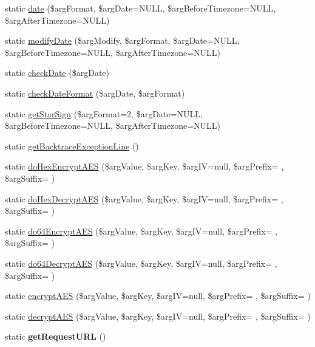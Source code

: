 \begin{DoxyCompactItemize}
\item 
static \hyperlink{class_generic_utilities_ad97b1434345f599d8dc23a5c74321684}{date} (\$arg\+Format, \$arg\+Date=N\+U\+L\+L, \$arg\+Before\+Timezone=N\+U\+L\+L, \$arg\+After\+Timezone=N\+U\+L\+L)
\item 
static \hyperlink{class_generic_utilities_a52a77780ed8600bfd00d2ee18d750f27}{modify\+Date} (\$arg\+Modify, \$arg\+Format, \$arg\+Date=N\+U\+L\+L, \$arg\+Before\+Timezone=N\+U\+L\+L, \$arg\+After\+Timezone=N\+U\+L\+L)
\item 
static \hyperlink{class_generic_utilities_a376a57d805b154b0cf59bffc88c4645f}{check\+Date} (\$arg\+Date)
\item 
static \hyperlink{class_generic_utilities_abd8c463fe50eb90852c0878ab44824ed}{check\+Date\+Format} (\$arg\+Date, \$arg\+Format)
\item 
static \hyperlink{class_generic_utilities_aae536b46e2b27f08f42a705a4c3a2725}{get\+Star\+Sign} (\$arg\+Format=2, \$arg\+Date=N\+U\+L\+L, \$arg\+Before\+Timezone=N\+U\+L\+L, \$arg\+After\+Timezone=N\+U\+L\+L)
\item 
static \hyperlink{class_generic_utilities_a2e121677b4c320aeffd646bbae8fe15b}{get\+Backtrace\+Exception\+Line} ()
\item 
static \hyperlink{class_generic_utilities_a821cf93b7e1f094ed97beff7fd7935f0}{do\+Hex\+Encrypt\+A\+E\+S} (\$arg\+Value, \$arg\+Key, \$arg\+I\+V=null, \$arg\+Prefix= \textquotesingle{}\textquotesingle{}, \$arg\+Suffix= \textquotesingle{}\textquotesingle{})
\item 
static \hyperlink{class_generic_utilities_a2a63c8d8379849d9f78fc4a8943a197e}{do\+Hex\+Decrypt\+A\+E\+S} (\$arg\+Value, \$arg\+Key, \$arg\+I\+V=null, \$arg\+Prefix= \textquotesingle{}\textquotesingle{}, \$arg\+Suffix= \textquotesingle{}\textquotesingle{})
\item 
static \hyperlink{class_generic_utilities_a402d3887fd9fcb5397ed9c66bd8160bd}{do64\+Encrypt\+A\+E\+S} (\$arg\+Value, \$arg\+Key, \$arg\+I\+V=null, \$arg\+Prefix= \textquotesingle{}\textquotesingle{}, \$arg\+Suffix= \textquotesingle{}\textquotesingle{})
\item 
static \hyperlink{class_generic_utilities_a0925b105d9a8bd0ccc30a373f5c94279}{do64\+Decrypt\+A\+E\+S} (\$arg\+Value, \$arg\+Key, \$arg\+I\+V=null, \$arg\+Prefix= \textquotesingle{}\textquotesingle{}, \$arg\+Suffix= \textquotesingle{}\textquotesingle{})
\item 
static \hyperlink{class_generic_utilities_a1002caa7da444f9c5abc9fda33f788ed}{encrypt\+A\+E\+S} (\$arg\+Value, \$arg\+Key, \$arg\+I\+V=null, \$arg\+Prefix= \textquotesingle{}\textquotesingle{}, \$arg\+Suffix= \textquotesingle{}\textquotesingle{})
\item 
static \hyperlink{class_generic_utilities_a57c8d906832d1a335c65dc3c121ece3f}{decrypt\+A\+E\+S} (\$arg\+Value, \$arg\+Key, \$arg\+I\+V=null, \$arg\+Prefix= \textquotesingle{}\textquotesingle{}, \$arg\+Suffix= \textquotesingle{}\textquotesingle{})
\item 
\hypertarget{class_generic_utilities_a8ecdea84ab8a715592f97d19eeaa6a5f}{}static {\bfseries get\+Request\+U\+R\+L} ()\label{class_generic_utilities_a8ecdea84ab8a715592f97d19eeaa6a5f}


\end{DoxyCompactItemize}
